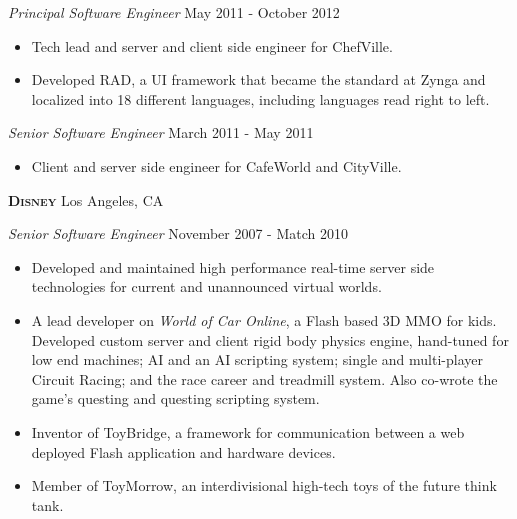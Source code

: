 \documentclass[a4paper]{article}
\begin{document}
\begin{addmargin}[1em]{0em}

\textit{Principal Software Engineer} \hfill May 2011 - October 2012\\
\vspace{-1mm}
\begin{itemize} \itemsep 1pt
    \item Tech lead and server and client side engineer for ChefVille.
    \item Developed RAD, a UI framework that became the standard at Zynga and localized
    into 18 different languages, including languages read right to left.
\end{itemize}
\textit{Senior Software Engineer} \hfill March 2011 - May 2011\\
\vspace{-1mm}
\begin{itemize} \itemsep 1pt
    \item Client and server side engineer for CafeWorld and CityVille.
\end{itemize}
\end{addmargin}

\textbf{\textsc{Disney}} \hfill Los Angeles, CA\\
\vspace{2mm}

\begin{addmargin}[1em]{0em}

\textit{Senior Software Engineer} \hfill November 2007 - Match 2010\\
\vspace{-1mm}
\begin{itemize} \itemsep 1pt
    \item Developed and maintained high performance real-time server side
        technologies for current and unannounced virtual worlds.
    \item A lead developer on \textit{World of Car Online}, a Flash based 3D MMO for kids.
        Developed custom server and client rigid body physics engine, hand-tuned for low 
        end machines; AI and an AI scripting system; single and multi-player Circuit Racing;
        and the race career and treadmill system. Also co-wrote the game's questing and 
        questing scripting system.
    \item Inventor of ToyBridge, a framework for communication between a web 
        deployed Flash application and hardware devices.
    \item Member of ToyMorrow, an interdivisional high-tech toys of the future think 
        tank.
\end{itemize}

\end{addmargin}
\end{document}
